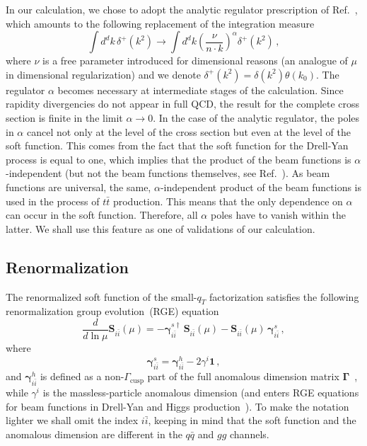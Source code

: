 \documentclass[a4paper,11pt]{article}
\newcommand{\ttbar}{\ensuremath{t \bar t}\xspace}
\newcommand{\qqbar}{{\ensuremath{q \bar q}}\xspace}
\newcommand{\bfS}{\bm{S}}
\newcommand{\iibar}{{i \bar i}}
\newcommand{\bfgamma}{\bm{\gamma}}
\newcommand{\bfI}{\bm{1}}
\newcommand{\bfGamma}{\bm{\Gamma}}
\numberwithin{equation}{section}
\begin{document}
In our calculation, we chose to adopt the analytic regulator prescription of
Ref.~\cite{Becher:2011dz}, which amounts to the following replacement of the
integration measure
%
\begin{equation}
 \int d^d k\, \delta^{+}(k^2)  \to
 \int d^d k \left(\frac{\nu}{n\cdot k}\right)^\alpha \delta^{+}(k^2)\,,
\end{equation}
%
where $\nu$ is a free parameter introduced for dimensional reasons (an analogue
of $\mu$ in dimensional regularization) and we denote $\delta^+(k^2) =
\delta(k^2) \theta(k_0)$.
%
The regulator $\alpha$ becomes necessary at intermediate stages of the
calculation. Since rapidity divergencies do not appear in full QCD, the result
for the complete cross section is finite in the limit $\alpha \to 0$.
%
In the case of the analytic regulator, the poles in $\alpha$ cancel not only at
the level of the cross section but even at the level of the soft function. This
comes from the fact that the soft function for the Drell-Yan process is equal to
one, which implies that the product of the beam functions is
$\alpha$-independent (but not the beam functions themselves, see
Ref.~\cite{Gehrmann:2014yya}). As beam functions are universal, the same,
$\alpha$-independent product of the beam functions is used in the process of
\ttbar production. This means that the only dependence on $\alpha$ can occur in
the soft function. Therefore, all $\alpha$ poles have to vanish within the 
latter. We shall use this feature as one of validations of our calculation.

\subsection{Renormalization}
\label{sec:renormalization}

The renormalized soft function of the small-$q_T$ factorization satisfies the
following renormalization group evolution~(RGE) equation~\cite{Zhu:2012ts}
%
%
\begin{equation}
  \frac{d}{d\ln \mu} \bfS_\iibar (\mu) =
  - \bfgamma^{s \dagger}_\iibar \,\bfS_\iibar (\mu)  
  - \bfS_\iibar (\mu)\, \bfgamma^{s}_\iibar \,,
  \label{eq:SF-RGE-main}
\end{equation}
%
where
%
\begin{equation}
  \bfgamma^{s}_\iibar = \bfgamma^{h}_\iibar - 2 \gamma^{i} \bfI\,,
\end{equation}
%
and $\bfgamma^{h}_\iibar$ is defined as a non-$\Gamma_\text{cusp}$ part of the
full anomalous dimension matrix $\bfGamma$~\cite{Ahrens:2010zv}, while
$\gamma^{i}$ is the massless-particle anomalous dimension (and enters RGE
equations for beam functions in Drell-Yan and Higgs
production~\cite{Becher:2010tm, Becher:2012yn}). To make the notation lighter
we shall omit the index $\iibar$, keeping in mind that the soft
function and the anomalous dimension are different in the \qqbar and $gg$
channels.
\end{document}
